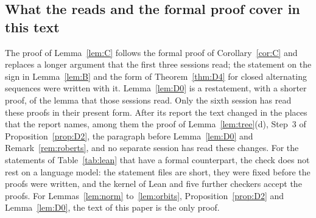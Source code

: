 \documentclass[11pt]{amsart}
\theoremstyle{definition}
\theoremstyle{remark}
\numberwithin{equation}{section}
\begin{document}
\subsection*{What the reads and the formal proof cover in this text} The proof of Lemma~\ref{lem:C}
follows the formal proof of Corollary~\ref{cor:C} and replaces a longer argument that the first three
sessions read; the statement on the sign in Lemma~\ref{lem:B} and the form of Theorem~\ref{thm:D4} for
closed alternating sequences were written with it. Lemma~\ref{lem:D0} is a restatement, with a shorter
proof, of the lemma that those sessions read. Only the sixth session has read these proofs in their
present form. After its report the text changed in the places that the report names, among them the
proof of Lemma~\ref{lem:tree}(d), Step~3 of Proposition~\ref{prop:D2}, the paragraph before
Lemma~\ref{lem:D0} and Remark~\ref{rem:roberts}, and no separate session has read these changes. For the
statements of Table~\ref{tab:lean} that have a formal counterpart, the check does not rest on a
language model: the statement files are short, they were fixed before the proofs were written, and the
kernel of Lean and five further checkers accept the proofs. For
Lemmas~\ref{lem:norm} to~\ref{lem:orbits}, Proposition~\ref{prop:D2} and Lemma~\ref{lem:D0}, the text
of this paper is the only proof.



\end{document}
